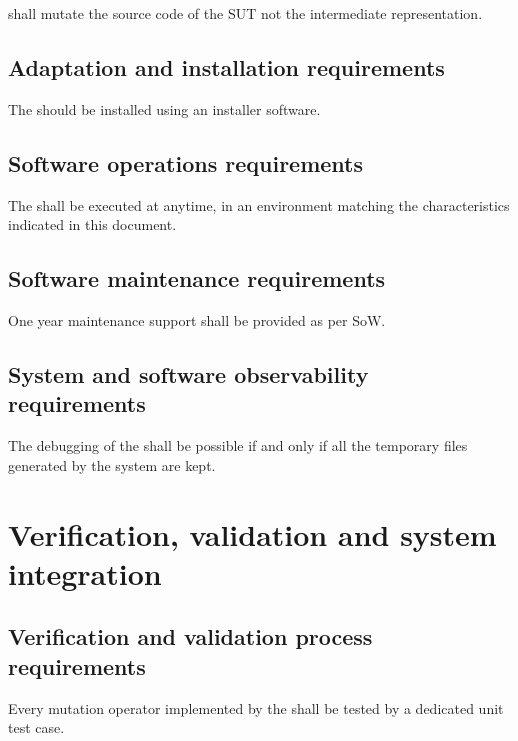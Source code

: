 \RQ{} \FAQAS shall mutate the source code of the SUT not the intermediate representation.


\section{Adaptation and installation requirements}


%
\RQ{} The \FAQAS should be installed using an installer software.


\section{Software operations requirements}

\RQ{} The \FAQAS shall be executed at anytime,
in an environment matching the characteristics indicated in this document.

\section{Software maintenance requirements}

\RQ{} One year maintenance support shall be provided as per SoW.

\section{System and software observability requirements}

\RQ{} The debugging of the \FAQAS shall be possible if and only if
all the temporary files generated by the system are kept.

\chapter{Verification, validation and system integration}
 \section{Verification and validation process requirements}

\RQ{} Every mutation operator implemented by the \FAQAS shall be tested by a dedicated unit test case.

